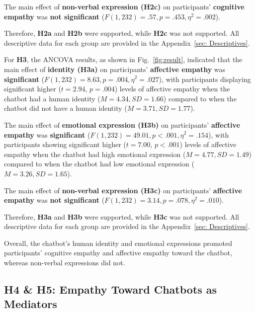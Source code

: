 The main effect of \textbf{non-verbal expression (H2c)} on participants' \textbf{cognitive empathy} was \textbf{not significant} (\(F(1, 232) = .57, p = .453, \eta^2 = .002 \)). 

Therefore, \textbf{H2a} and \textbf{H2b} were supported, while \textbf{H2c} was not supported. All descriptive data for each group are provided in the Appendix~\ref{sec: Descriptives}. 

For \textbf{H3}, the ANCOVA results, as shown in Fig.~\ref{fig:result}, indicated that the main effect of \textbf{identity (H3a)} on participants' \textbf{affective empathy} was \textbf{significant} (\(F(1, 232) = 8.63, p = .004, \eta^2 = .027 \)), with participants displaying significant higher ($t=2.94$, $p=.004$) levels of affective empathy when the chatbot had a human identity (\(M = 4.34, SD = 1.66 \)) compared to when the chatbot did not have a human identity (\(M = 3.71, SD = 1.77 \)). 

The main effect of \textbf{emotional expression (H3b)} on participants' \textbf{affective empathy} was \textbf{significant} (\(F(1, 232) = 49.01, p < .001, \eta^2 = .154 \)), with participants showing significant higher ($t=7.00$, $p<.001$) levels of affective empathy when the chatbot had high emotional expression (\(M = 4.77, SD = 1.49 \)) compared to when the chatbot had low emotional expression (\(M = 3.26, SD = 1.65 \)). 

The main effect of \textbf{non-verbal expression (H3c)} on participants' \textbf{affective empathy} was \textbf{not significant} (\(F(1, 232) = 3.14, p = .078, \eta^2 = .010 \)). 


Therefore, \textbf{H3a} and \textbf{H3b} were supported, while \textbf{H3c} was not supported. All descriptive data for each group are provided in the Appendix~\ref{sec: Descriptives}. 

Overall, the chatbot's human identity and emotional expressions promoted participants' cognitive empathy and affective empathy toward the chatbot, whereas non-verbal expressions did not.




\subsection{H4 \& H5: Empathy Toward Chatbots as Mediators}

